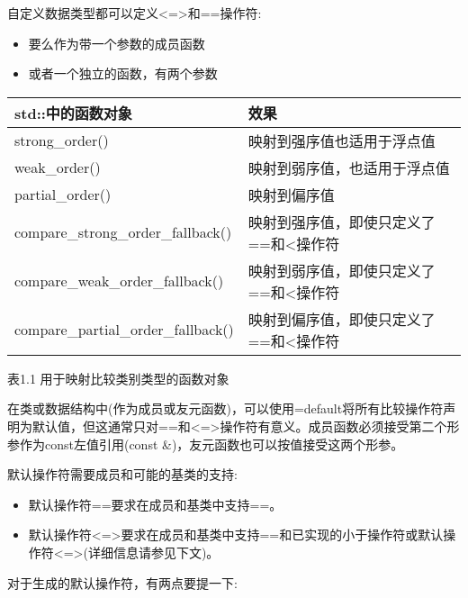

自定义数据类型都可以定义<=>和==操作符:

\begin{itemize}
\item
要么作为带一个参数的成员函数

\item
或者一个独立的函数，有两个参数
\end{itemize}


\begin{longtable}[c]{|l|l|}
\hline
\textbf{std::中的函数对象} & \textbf{效果}                                             \\ \hline
\endfirsthead
%
\endhead
%
strong\_order()                   & 映射到强序值也适用于浮点值 \\ \hline
weak\_order()                     & 映射到弱序值，也适用于浮点值   \\ \hline
partial\_order()                  & 映射到偏序值                               \\ \hline
compare\_strong\_order\_fallback()  & 映射到强序值，即使只定义了==和<操作符  \\ \hline
compare\_weak\_order\_fallback()    & 映射到弱序值，即使只定义了==和<操作符    \\ \hline
compare\_partial\_order\_fallback() & 映射到偏序值，即使只定义了==和<操作符 \\ \hline
\end{longtable}

\begin{center}
表1.1 用于映射比较类别类型的函数对象
\end{center}



在类或数据结构中(作为成员或友元函数)，可以使用=default将所有比较操作符声明为默认值，但这通常只对==和<=>操作符有意义。成员函数必须接受第二个形参作为const左值引用(const \&)，友元函数也可以按值接受这两个形参。

默认操作符需要成员和可能的基类的支持:

\begin{itemize}
\item
默认操作符==要求在成员和基类中支持==。

\item
默认操作符<=>要求在成员和基类中支持==和已实现的小于操作符或默认操作符<=>(详细信息请参见下文)。
\end{itemize}

对于生成的默认操作符，有两点要提一下:


